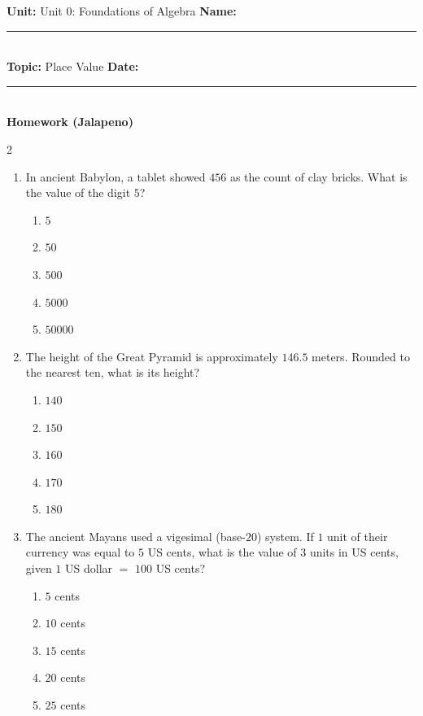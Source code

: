 \documentclass[10pt]{article}
\begin{document}
\enlargethispage{2.5cm}

\begin{tcolorbox}[colback=mainblue!5, colframe=mainblue, sharp corners, boxrule=0.5pt]
    \small \textbf{Unit:} Unit 0: Foundations of Algebra \hfill \textbf{Name:} \rule{3cm}{0.4pt} \\
    \small \textbf{Topic:} Place Value \hfill \textbf{Date:} \rule{2cm}{0.4pt} \\
    \centering \textbf{\large Homework (Jalapeno)}
\end{tcolorbox}

\vspace{0.2cm}

\begin{multicols}{2}
\begin{enumerate}[label=\textbf{Q\arabic*.}, leftmargin=*, itemsep=6pt, parsep=0pt]

  \item \small In ancient Babylon, a tablet showed $456$ as the count of clay bricks. What is the value of the digit $5$?
  \begin{enumerate}[label=(\Alph*), leftmargin=0.6cm, nosep, itemsep=2pt]
    \item $5$
    \item $50$
    \item $500$
    \item $5000$
    \item $50000$
  \end{enumerate}

  \item \small The height of the Great Pyramid is approximately $146.5$ meters. Rounded to the nearest ten, what is its height?
  \begin{enumerate}[label=(\Alph*), leftmargin=0.6cm, nosep, itemsep=2pt]
    \item $140$
    \item $150$
    \item $160$
    \item $170$
    \item $180$
  \end{enumerate}

  \item \small The ancient Mayans used a vigesimal (base-$20$) system. If $1$ unit of their currency was equal to $5$ US cents, what is the value of $3$ units in US cents, given $1$ US dollar $=$ $100$ US cents?
  \begin{enumerate}[label=(\Alph*), leftmargin=0.6cm, nosep, itemsep=2pt]
    \item $5$ cents
    \item $10$ cents
    \item $15$ cents
    \item $20$ cents
    \item $25$ cents
  \end{enumerate}


\end{enumerate}
\end{multicols}
\end{document}
